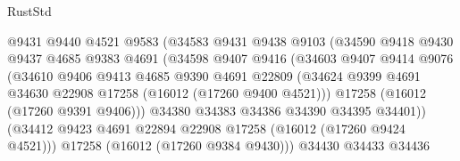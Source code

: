 \begin{lexlean}{RustStd}
\begin{coremodule}
                                @9431
                                @9440
                                @4521
                                @9583
                                (@34583
                                  @9431
                                  @9438
                                  @9103
                                  (@34590
                                    @9418
                                    @9430
                                    @9437
                                    @4685
                                    @9383
                                    @4691
                                    (@34598
                                      @9407
                                      @9416
                                      (@34603
                                        @9407
                                        @9414
                                        @9076
                                        (@34610
                                          @9406
                                          @9413
                                          @4685
                                          @9390
                                          @4691
                                          @22809
                                          (@34624
                                            @9399
                                            @4691
                                            @34630
                                            @22908
                                            @17258
                                            (@16012 (@17260 @9400 @4521)))
                                          @17258
                                          (@16012 (@17260 @9391 @9406)))
                                        @34380
                                        @34383
                                        @34386
                                        @34390
                                        @34395
                                        @34401))
                                    (@34412
                                      @9423
                                      @4691
                                      @22894
                                      @22908
                                      @17258
                                      (@16012 (@17260 @9424 @4521)))
                                    @17258
                                    (@16012 (@17260 @9384 @9430)))
                                  @34430
                                  @34433
                                  @34436

\end{coremodule}
\end{lexlean}
